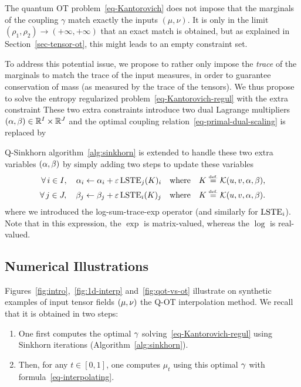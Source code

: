 The quantum OT problem~\eqref{eq-Kantorovich} does not impose that the marginals of the coupling $\gamma$ match exactly the inputs $(\mu,\nu)$. It is only in the limit $(\rho_1,\rho_2) \rightarrow (+\infty,+\infty)$ that an exact match is obtained, but as explained in Section~\ref{sec-tensor-ot}, this might leads to an empty constraint set.

To address this potential issue, we propose to rather only impose the \textit{trace} of the marginals to match the trace of the input measures, in order to guarantee conservation of mass (as measured by the trace of the tensors). We thus propose to solve the entropy regularized problem~\eqref{eq-Kantorovich-regul} with the extra constraint
These two extra constraints introduce two dual Lagrange multipliers $(\alpha,\beta) \in \mathbb{R}^I \times \mathbb{R}^J$ and the optimal coupling relation~\eqref{eq-primal-dual-scaling} is replaced by 

Q-Sinkhorn algorithm~\ref{alg:sinkhorn} is extended to handle these two extra variables $(\alpha,\beta)$ by simply adding two steps to update these variables
\begin{align*}
	\foralls i \in I, \quad \al_i \leftarrow \al_i + \epsilon \LSTE_j( K )_i \qwhereq K \eqdef \Kern(u,v,\al,\be), \\
	\foralls j \in J, \quad \be_j \leftarrow \be_j + \epsilon \LSTE_i( K )_j \qwhereq K \eqdef \Kern(u,v,\al,\be).
\end{align*}
where we introduced the log-sum-trace-exp operator
(and similarly for $\operatorname{LSTE}_i$). Note that in this expression, the $\exp$ is matrix-valued, whereas the $\log$ is real-valued.


\subsection{Numerical Illustrations}
\label{sec-numerics-interp}

Figures~\ref{fig:intro},~\ref{fig:1d-interp} and~\ref{fig:qot-vs-ot} illustrate on synthetic examples of input tensor fields $(\mu,\nu)$ the Q-OT interpolation method. 
%
We recall that it is obtained in two steps:
\begin{enumerate}
	\item One first computes the optimal $\gamma$ solving~\eqref{eq-Kantorovich-regul} using Sinkhorn iterations (Algorithm~\ref{alg:sinkhorn}).
	\item Then, for any $t \in [0,1]$, one computes $\mu_t$ using this optimal $\gamma$ with formula~\eqref{eq-interpolating}.
\end{enumerate}
   

